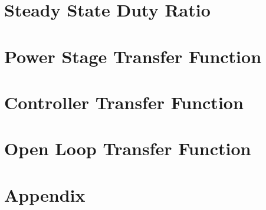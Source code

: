 

%


\vfill{}
\tableofcontents
\vfill{}
\clearpage

\part{Steady State Duty Ratio}
			\clearpage
\part{Power Stage Transfer Function}
			\clearpage
\part{Controller Transfer Function}
			\clearpage
\part{Open Loop Transfer Function}
			\clearpage
\part{Appendix}
		\clearpage

